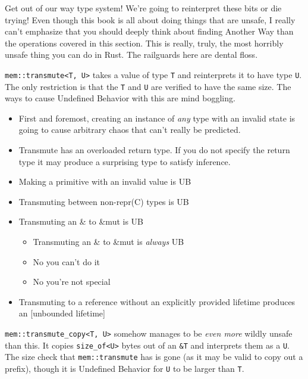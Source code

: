 \documentclass[a4paper,]{book}
\begin{document}
Get out of our way type system! We're going to reinterpret these bits or
die trying! Even though this book is all about doing things that are
unsafe, I really can't emphasize that you should deeply think about
finding Another Way than the operations covered in this section. This is
really, truly, the most horribly unsafe thing you can do in Rust. The
railguards here are dental floss.

\texttt{mem::transmute\textless{}T,\ U\textgreater{}} takes a value of
type \texttt{T} and reinterprets it to have type \texttt{U}. The only
restriction is that the \texttt{T} and \texttt{U} are verified to have
the same size. The ways to cause Undefined Behavior with this are mind
boggling.

\begin{itemize}
\itemsep1pt\parskip0pt
\item
  First and foremost, creating an instance of \emph{any} type with an
  invalid state is going to cause arbitrary chaos that can't really be
  predicted.
\item
  Transmute has an overloaded return type. If you do not specify the
  return type it may produce a surprising type to satisfy inference.
\item
  Making a primitive with an invalid value is UB
\item
  Transmuting between non-repr(C) types is UB
\item
  Transmuting an \& to \&mut is UB

  \begin{itemize}
  \itemsep1pt\parskip0pt
  \item
    Transmuting an \& to \&mut is \emph{always} UB
  \item
    No you can't do it
  \item
    No you're not special
  \end{itemize}
\item
  Transmuting to a reference without an explicitly provided lifetime
  produces an {[}unbounded lifetime{]}
\end{itemize}

\texttt{mem::transmute\_copy\textless{}T,\ U\textgreater{}} somehow
manages to be \emph{even more} wildly unsafe than this. It copies
\texttt{size\_of\textless{}U\textgreater{}} bytes out of an \texttt{\&T}
and interprets them as a \texttt{U}. The size check that
\texttt{mem::transmute} has is gone (as it may be valid to copy out a
prefix), though it is Undefined Behavior for \texttt{U} to be larger
than \texttt{T}.
\end{document}
